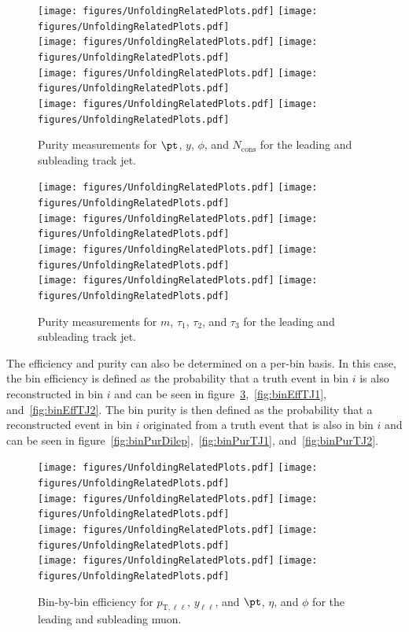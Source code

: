 \begin{figure}[h!]
  \centering
  \texttt{[image: figures/UnfoldingRelatedPlots.pdf]}
  \texttt{[image: figures/UnfoldingRelatedPlots.pdf]} \\
  \texttt{[image: figures/UnfoldingRelatedPlots.pdf]}
  \texttt{[image: figures/UnfoldingRelatedPlots.pdf]} \\
  \texttt{[image: figures/UnfoldingRelatedPlots.pdf]}
  \texttt{[image: figures/UnfoldingRelatedPlots.pdf]} \\
  \texttt{[image: figures/UnfoldingRelatedPlots.pdf]}
  \texttt{[image: figures/UnfoldingRelatedPlots.pdf]}
  \caption{Purity measurements for $\pt$, $y$, $\phi$, and $N_{\text{cons}}$ for the leading and subleading track jet.}
  \label{fig:PurTJ1}
\end{figure}

\begin{figure}[h!]
  \centering
  \texttt{[image: figures/UnfoldingRelatedPlots.pdf]}
  \texttt{[image: figures/UnfoldingRelatedPlots.pdf]} \\
  \texttt{[image: figures/UnfoldingRelatedPlots.pdf]}
  \texttt{[image: figures/UnfoldingRelatedPlots.pdf]} \\
  \texttt{[image: figures/UnfoldingRelatedPlots.pdf]}
  \texttt{[image: figures/UnfoldingRelatedPlots.pdf]} \\
  \texttt{[image: figures/UnfoldingRelatedPlots.pdf]}
  \texttt{[image: figures/UnfoldingRelatedPlots.pdf]}
  \caption{Purity measurements for $m$, $\tau_1$, $\tau_2$, and $\tau_3$ for the leading and subleading track jet.}
  \label{fig:PurTJ2}
\end{figure}

The efficiency and purity can also be determined on a per-bin basis. In this case, the bin efficiency is defined as the probability that a truth event in bin $i$ is also reconstructed in bin $i$ and can be seen in figure~\ref{fig:binEffDilep},~\ref{fig:binEffTJ1}, and~\ref{fig:binEffTJ2}. The bin purity is then defined as the probability that a reconstructed event in bin $i$ originated from a truth event that is also in bin $i$ and can be seen in figure~\ref{fig:binPurDilep},~\ref{fig:binPurTJ1}, and~\ref{fig:binPurTJ2}.

\begin{figure}[h!]
  \centering
  \texttt{[image: figures/UnfoldingRelatedPlots.pdf]}
  \texttt{[image: figures/UnfoldingRelatedPlots.pdf]} \\
  \texttt{[image: figures/UnfoldingRelatedPlots.pdf]}
  \texttt{[image: figures/UnfoldingRelatedPlots.pdf]} \\
  \texttt{[image: figures/UnfoldingRelatedPlots.pdf]}
  \texttt{[image: figures/UnfoldingRelatedPlots.pdf]} \\
  \texttt{[image: figures/UnfoldingRelatedPlots.pdf]}
  \texttt{[image: figures/UnfoldingRelatedPlots.pdf]}
  \caption{Bin-by-bin efficiency for $p_{\text{T},\ell\ell}$, $y_{\ell\ell}$, and $\pt$, $\eta$, and $\phi$ for the leading and subleading muon.}
  \label{fig:binEffDilep}
\end{figure}

